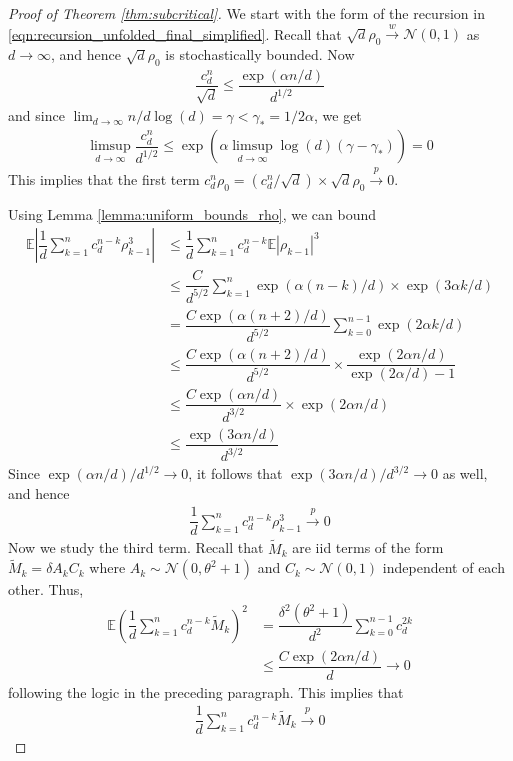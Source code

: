 \documentclass[12pt]{article}
\def\gN{{\mathcal{N}}}
\newcommand{\E}{\mathbb{E}}
\begin{document}
\begin{proof}[Proof of Theorem \ref{thm:subcritical}] 
We start with the form of the recursion in \ref{eqn:recursion_unfolded_final_simplified}. Recall that $\sqrt{d}\rho_0\stackrel{w}{\to}\gN(0,1)$ as $d\to\infty$, and hence $\sqrt{d}\rho_0$ is stochastically bounded. Now
\begin{align*}
    \dfrac{c_d^n}{\sqrt{d}}\leq \dfrac{\exp(\alpha n/d)}{d^{1/2}}
\end{align*}and since $\lim_{d\to\infty} n/d\log(d)=\gamma<\gamma_*=1/2\alpha$, we get
\begin{align*}
    \limsup_{d\to\infty}\dfrac{c_d^n}{d^{1/2}}\leq \exp\left(\alpha \limsup_{d\to\infty}\log(d)\left(\gamma-\gamma_*\right)\right)=0
\end{align*}This implies that the first term $c_d^n\rho_0=(c_d^n/\sqrt{d})\times \sqrt{d}\rho_0\stackrel{p}{\to}0$.

Using Lemma \ref{lemma:uniform_bounds_rho}, we can bound
\begin{align*}
    \E\left|\dfrac{1}{d}\sum_{k=1}^n c_d^{n-k}\rho_{k-1}^3\right|&\leq \dfrac{1}{d}\sum_{k=1}^n c_d^{n-k}\E|\rho_{k-1}|^3\\
    &\leq \dfrac{C}{d^{5/2}}\sum_{k=1}^n\exp(\alpha(n-k)/d)\times \exp(3\alpha k/d)\\
    &=\dfrac{C\exp(\alpha (n+2)/d)}{d^{5/2}}\sum_{k=0}^{n-1}\exp(2\alpha k/d)\\
    &\leq \dfrac{C\exp(\alpha(n+2)/d)}{d^{5/2}}\times \dfrac{\exp(2\alpha n/d)}{\exp(2\alpha/d)-1}\\
    &\leq \dfrac{C\exp(\alpha n/d)}{d^{3/2}}\times \exp(2\alpha n/d)\\
    &\leq \dfrac{\exp(3\alpha n/d)}{d^{3/2}}
\end{align*}Since $\exp(\alpha n/d)/d^{1/2}\to0$, it follows that $\exp(3\alpha n/d)/d^{3/2}\to 0$ as well, and hence
\begin{align*}
\dfrac{1}{d}\sum_{k=1}^n c_d^{n-k}\rho_{k-1}^3\stackrel{p}{\to}0
\end{align*}
Now we study the third term. Recall that $\tilde M_k$ are iid terms of the form $\tilde M_k=\delta A_kC_k$ where $A_k\sim\gN(0,\theta^2+1)$ and $C_k\sim \gN(0,1)$ independent of each other. Thus, 
\begin{align*}
    \E\left(\dfrac{1}{d}\sum_{k=1}^n c_d^{n-k}\tilde M_k\right)^2 &= \dfrac{\delta^2(\theta^2+1)}{d^2}\sum_{k=0}^{n-1} c_d^{2k}\\
    &\leq \dfrac{C\exp(2\alpha n/d)}{d}\to 0
\end{align*}following the logic in the preceding paragraph. This implies that
\begin{align*}
    \dfrac{1}{d}\sum_{k=1}^n c_d^{n-k}\tilde M_k\stackrel{p}{\to}0
\end{align*}


\end{proof}
\end{document}
